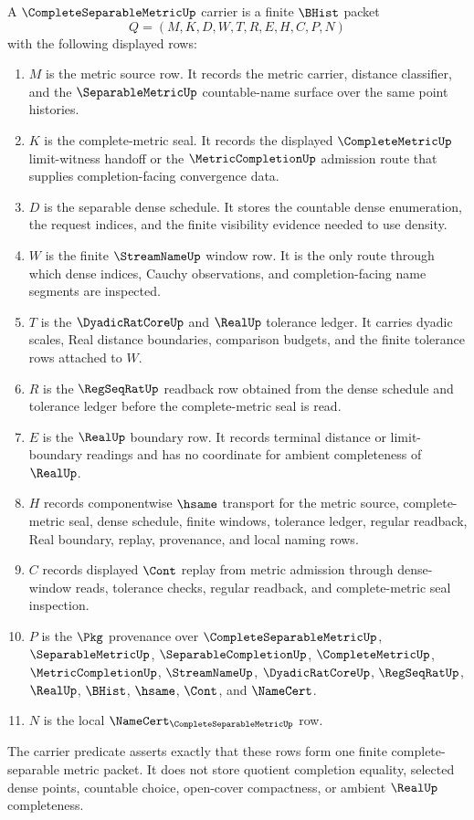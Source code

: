 \begin{definition}\label{def:complete-separable-metric-carrier}
A $\CompleteSeparableMetricUp$ carrier is a finite $\BHist$ packet
$$
Q=(M,K,D,W,T,R,E,H,C,P,N)
$$
with the following displayed rows:
\begin{enumerate}
\item $M$ is the metric source row. It records the metric carrier, distance classifier, and the $\SeparableMetricUp$ countable-name surface over the same point histories.
\item $K$ is the complete-metric seal. It records the displayed $\CompleteMetricUp$ limit-witness handoff or the $\MetricCompletionUp$ admission route that supplies completion-facing convergence data.
\item $D$ is the separable dense schedule. It stores the countable dense enumeration, the request indices, and the finite visibility evidence needed to use density.
\item $W$ is the finite $\StreamNameUp$ window row. It is the only route through which dense indices, Cauchy observations, and completion-facing name segments are inspected.
\item $T$ is the $\DyadicRatCoreUp$ and $\RealUp$ tolerance ledger. It carries dyadic scales, Real distance boundaries, comparison budgets, and the finite tolerance rows attached to $W$.
\item $R$ is the $\RegSeqRatUp$ readback row obtained from the dense schedule and tolerance ledger before the complete-metric seal is read.
\item $E$ is the $\RealUp$ boundary row. It records terminal distance or limit-boundary readings and has no coordinate for ambient completeness of $\RealUp$.
\item $H$ records componentwise $\hsame$ transport for the metric source, complete-metric seal, dense schedule, finite windows, tolerance ledger, regular readback, Real boundary, replay, provenance, and local naming rows.
\item $C$ records displayed $\Cont$ replay from metric admission through dense-window reads, tolerance checks, regular readback, and complete-metric seal inspection.
\item $P$ is the $\Pkg$ provenance over $\CompleteSeparableMetricUp$, $\SeparableMetricUp$, $\SeparableCompletionUp$, $\CompleteMetricUp$, $\MetricCompletionUp$, $\StreamNameUp$, $\DyadicRatCoreUp$, $\RegSeqRatUp$, $\RealUp$, $\BHist$, $\hsame$, $\Cont$, and $\NameCert$.
\item $N$ is the local $\NameCert_{\CompleteSeparableMetricUp}$ row.
\end{enumerate}
The carrier predicate asserts exactly that these rows form one finite complete-separable metric packet. It does not store quotient completion equality, selected dense points, countable choice, open-cover compactness, or ambient $\RealUp$ completeness.
\end{definition}

